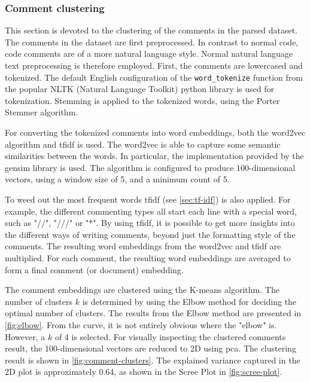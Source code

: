 \subsubsection{Comment clustering}
\label{sec:comment-clustering}
This section is devoted to the clustering of the comments in the parsed dataset. The comments in the dataset are first preprocessed. In contrast to normal code, code comments are of a more natural language style. Normal natural language text preprocessing is therefore employed. First, the comments are lowercased and tokenized. The default English configuration of the \lstinline[language=Python]!word_tokenize! function from the popular NLTK (Natural Language Toolkit) \cite{nltk} python library is used for tokenization. Stemming is applied to the tokenized words, using the Porter Stemmer algorithm.

For converting the tokenized comments into word embeddings, both the word2vec algorithm \cite{word2vec} and \acrfull{tfidf} is used. The word2vec is able to capture some semantic similarities between the words. In particular, the implementation provided by the gensim library \cite{gensim} is used. The algorithm is configured to produce 100-dimensional vectors, using a window size of 5, and a minimum count of 5. 

To weed out the most frequent words \acrfull{tfidf} (see \cref{sec:tf-idf}) is also applied. For example, the different commenting types all start each line with a special word, such as "//", "///" or "*". By using \acrshort{tfidf}, it is possible to get more insights into the different ways of writing comments, beyond just the formatting style of the comments. The resulting word embeddings from the word2vec and \acrshort{tfidf} are multiplied. For each comment, the resulting word embeddings are averaged to form a final comment (or document) embedding.

The comment embeddings are clustered using the K-means algorithm. The number of clusters \(k\) is determined by using the Elbow method for deciding the optimal number of clusters. The results from the Elbow method are presented in \cref{fig:elbow}. From the curve, it is not entirely obvious where the "elbow" is. However, a \(k\) of 4 is selected. For visually inspecting the clustered comments result, the 100-dimensional vectors are reduced to 2D using \acrfull{pca}. The clustering result is shown in \cref{fig:comment-clusters}. The explained variance captured in the 2D plot is approximately 0.64, as shown in the Scree Plot in \cref{fig:scree-plot}.

